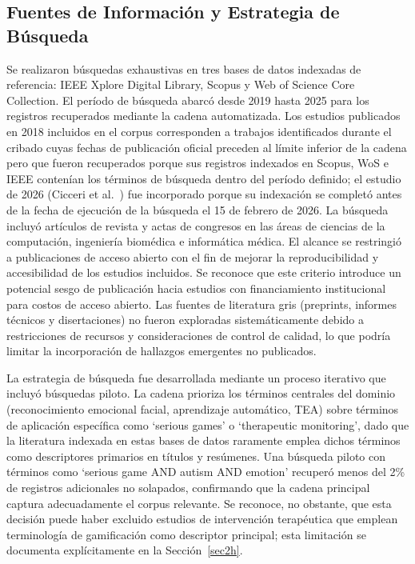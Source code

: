 \documentclass[3p,twocolumn,times]{elsarticle}
\begin{document}
	\subsection{Fuentes de Información y Estrategia de Búsqueda}\label{sec2c}
	
	Se realizaron búsquedas exhaustivas en tres bases de datos indexadas de
	referencia: IEEE Xplore Digital Library, Scopus y Web of Science Core Collection.
	El período de búsqueda abarcó desde 2019 hasta 2025 para los registros recuperados
	mediante la cadena automatizada. Los estudios publicados en 2018 incluidos en el
	corpus corresponden a trabajos identificados durante el cribado cuyas fechas de
	publicación oficial preceden al límite inferior de la cadena pero que fueron
	recuperados porque sus registros indexados en Scopus, WoS e IEEE contenían los
	términos de búsqueda dentro del período definido; el estudio de 2026 (Cicceri et al.\
	\cite{Cicceri2026}) fue incorporado porque su indexación se completó antes de la
	fecha de ejecución de la búsqueda el 15 de febrero de 2026. La búsqueda incluyó
	artículos de revista y actas de congresos en las áreas de ciencias de la computación,
	ingeniería biomédica e informática médica. El alcance se restringió a publicaciones
	de acceso abierto con el fin de mejorar la reproducibilidad y accesibilidad de los
	estudios incluidos. Se reconoce que este criterio introduce un potencial sesgo de
	publicación hacia estudios con financiamiento institucional para costos de acceso
	abierto. Las fuentes de literatura gris (preprints, informes técnicos y
	disertaciones) no fueron exploradas sistemáticamente debido a restricciones de
	recursos y consideraciones de control de calidad, lo que podría limitar la
	incorporación de hallazgos emergentes no publicados.
	
	La estrategia de búsqueda fue desarrollada mediante un proceso iterativo que
	incluyó búsquedas piloto. La cadena prioriza los términos centrales del dominio
	(reconocimiento emocional facial, aprendizaje automático, TEA) sobre términos de
	aplicación específica como `serious games' o `therapeutic monitoring', dado que
	la literatura indexada en estas bases de datos raramente emplea dichos términos
	como descriptores primarios en títulos y resúmenes. Una búsqueda piloto con
	términos como `serious game AND autism AND emotion' recuperó menos del 2\% de
	registros adicionales no solapados, confirmando que la cadena principal captura
	adecuadamente el corpus relevante. Se reconoce, no obstante, que esta decisión
	puede haber excluido estudios de intervención terapéutica que emplean terminología
	de gamificación como descriptor principal; esta limitación se documenta
	explícitamente en la Sección~\ref{sec2h}.
	
\end{document}
